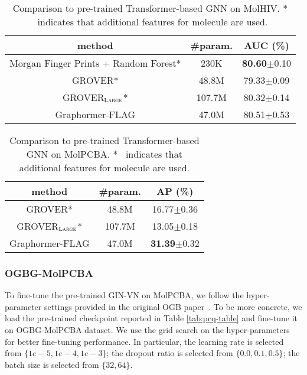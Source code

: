 \documentclass{article}
\begin{document}
\begin{table}[t]
\centering
\small
\caption{Comparison to pre-trained Transformer-based GNN on MolHIV. * \ indicates that additional features for molecule are used.}\label{tab:hiv-appendix}
\begin{tabular}{c|c|c}
\toprule
  method   & \#param. & AUC (\%) \\
\hline
Morgan Finger Prints + Random Forest*& 230K & \textbf{80.60}$\pm$0.10 \\
\hline
GROVER*\cite{rong2020self} &48.8M & 79.33$\pm$0.09 \\
GROVER$_{\small \textsc{Large}}$*\cite{rong2020self} &107.7M & 80.32$\pm$0.14 \\
\hline
Graphormer-{\scriptsize FLAG} &47.0M& 80.51$\pm$0.53  \\
\bottomrule
\end{tabular}
\end{table}


\begin{table}[t]
\centering
\small
\caption{Comparison to pre-trained Transformer-based GNN on MolPCBA. * \ indicates that additional features for molecule are used.}\label{tab:pcba-appendix}
\begin{tabular}{c|c|c}
\toprule
  method   & \#param. & AP (\%) \\

\hline
GROVER*\cite{rong2020self} &48.8M & 16.77$\pm$0.36 \\
GROVER$_{\small \textsc{Large}}$*\cite{rong2020self} &107.7M & 13.05$\pm$0.18 \\
\hline
Graphormer-{\scriptsize FLAG} &47.0M& \textbf{31.39}$\pm$0.32  \\
\bottomrule
\end{tabular}
\end{table}




\subsubsection{OGBG-MolPCBA}
To fine-tune the pre-trained GIN-{\scriptsize VN} on MolPCBA, we follow the hyper-parameter settings provided in the original OGB paper~\cite{hu2020open}. To be more concrete, we load the pre-trained checkpoint reported in Table \ref{tab:pcq-table} and fine-tune it on OGBG-MolPCBA dataset. We use the grid search on the hyper-parameters for better fine-tuning performance. In particular, the learning rate is selected from $\{1e-5, 1e-4, 1e-3\}$; the dropout ratio is selected from $\{0.0, 0.1, 0.5\}$; the batch size is selected from $\{32, 64\}$. 
\end{document}
